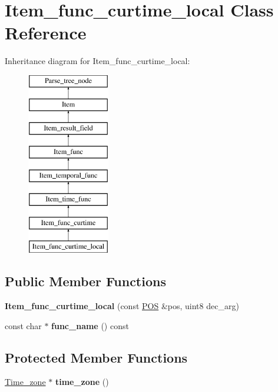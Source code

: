 \hypertarget{classItem__func__curtime__local}{}\section{Item\+\_\+func\+\_\+curtime\+\_\+local Class Reference}
\label{classItem__func__curtime__local}
Inheritance diagram for Item\+\_\+func\+\_\+curtime\+\_\+local\+:\begin{figure}[H]
\begin{center}
\leavevmode
\includegraphics[height=8.000000cm]{classItem__func__curtime__local}
\end{center}
\end{figure}
\subsection*{Public Member Functions}
\begin{DoxyCompactItemize}
\item 
\mbox{\label{classItem__func__curtime__local_a0a88d15db829193427c2f53285e9ecab}} 
{\bfseries Item\+\_\+func\+\_\+curtime\+\_\+local} (const \mbox{\hyperlink{structYYLTYPE}{P\+OS}} \&pos, uint8 dec\+\_\+arg)
\item 
\mbox{\label{classItem__func__curtime__local_a698c3fa2f6447bd71658762818f13fd5}} 
const char $\ast$ {\bfseries func\+\_\+name} () const
\end{DoxyCompactItemize}
\subsection*{Protected Member Functions}
\begin{DoxyCompactItemize}
\item 
\mbox{\label{classItem__func__curtime__local_aa8166f85ae7d1e953b4b587bc55925a0}} 
\mbox{\hyperlink{classTime__zone}{Time\+\_\+zone}} $\ast$ {\bfseries time\+\_\+zone} ()
\end{DoxyCompactItemize}

